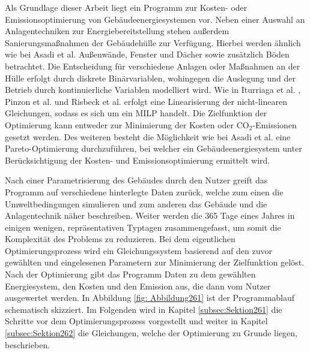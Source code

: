 Als Grundlage dieser Arbeit liegt ein Programm zur Kosten- oder Emissionsoptimierung von Gebäudeenergiesystemen vor.
Neben einer Auswahl an Anlagentechniken zur Energiebereitstellung stehen außerdem Sanierungsmaßnahmen der Gebäudehülle zur Verfügung. 
Hierbei werden ähnlich wie bei Asadi et al. \cite{Asadi.2012} Außenwände, Fenster und Dächer sowie zusätzlich Böden betrachtet.
Die Entscheidung für verschiedene Anlagen oder Maßnahmen an der Hülle erfolgt durch diskrete Binärvariablen, wohingegen die Auslegung und der Betrieb durch kontinuierliche Variablen modelliert wird.
Wie in Iturriaga et al. \cite{Iturriaga.2017}, Pinzon et al. \cite{Pinzon.23.04.201726.04.2017} und Risbeck et al. \cite{Risbeck.2017} erfolgt eine Linearisierung der nicht-linearen Gleichungen, sodass es sich um ein MILP handelt.
Die Zielfunktion der Optimierung kann entweder zur Minimierung der Kosten oder CO\(_2\)-Emissionen gesetzt werden.
Des weiteren besteht die Möglichkeit wie bei Asadi et al. \cite{Asadi.2012} eine Pareto-Optimierung durchzuführen, bei welcher ein Gebäudeenergiesystem unter Berücksichtigung der Kosten- und Emissionsoptimierung ermittelt wird.

Nach einer Parametrisierung des Gebäudes durch den Nutzer greift das Programm auf verschiedene hinterlegte Daten zurück, welche zum einen die Umweltbedingungen simulieren und zum anderen das Gebäude und die Anlagentechnik näher beschreiben.
Weiter werden die 365 Tage eines Jahres in einigen wenigen, repräsentativen Typtagen zusammengefasst, um somit die Komplexität des Problems zu reduzieren.
Bei dem eigentlichen Optimierungsprozess wird ein Gleichungssystem basierend auf den zuvor gewählten und eingelesenen Parametern zur Minimierung der Zielfunktion gelöst.
Nach der Optimierung gibt das Programm Daten zu dem gewählten Energiesystem, den Kosten und den Emission aus, die dann vom Nutzer ausgewertet werden.
In Abbildung \ref{fig: Abbildung261} ist der Programmablauf schematisch skizziert.
Im Folgenden wird in Kapitel \ref{subsec:Sektion261} die Schritte vor dem Optimierungsprozess vorgestellt und weiter in Kapitel \ref{subsec:Sektion262} die Gleichungen, welche der Optimierung zu Grunde liegen, beschrieben.

